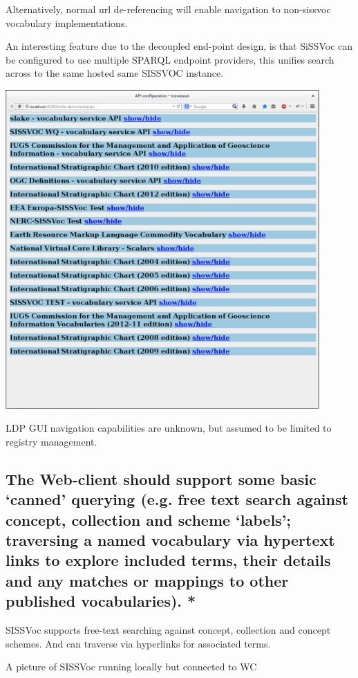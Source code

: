 \documentclass[10pt,a4paper]{article}
\begin{document}
\begin{flushleft}
Alternatively, normal url de-referencing will enable navigation to non-sissvoc
vocabulary implementations.

An interesting feature due to the decoupled end-point design, is that SiSSVoc 
can be configured to use multiple SPARQL endpoint providers, this unifies search 
across to the same hosted same SISSVOC instance. 

\includegraphics[width=12cm]{multipleendpoints}  

LDP GUI navigation capabilities are unknown, but assumed to be limited to 
registry management.


\subsection{ The Web-client should support some basic ‘canned’ querying (e.g.
free text search against concept, collection and scheme ‘labels’; traversing a
named vocabulary via hypertext links to explore included terms, their details
and any matches or mappings to other published vocabularies). * }

SISSVoc supports free-text searching against concept, collection and concept
schemes. And can traverse via hyperlinks for associated terms. 

A picture of SISSVoc running locally but connected to WC 


\end{flushleft}
\end{document}
